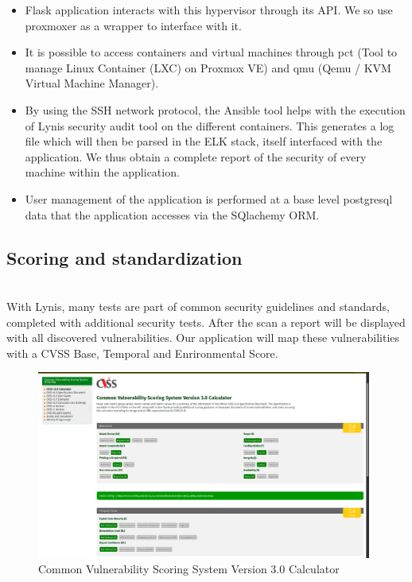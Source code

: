 \begin{itemize}
\item
  Flask application interacts with this hypervisor through its API. We
  so use proxmoxer as a wrapper to interface with
  it.
\item
  It is possible to access containers and virtual machines through
  pct (Tool to manage Linux Container (LXC) on Proxmox VE) and
  qmu (Qemu / KVM Virtual Machine Manager).
\item
  By using the SSH network protocol, the Ansible tool helps with the execution of
  Lynis security audit tool on the different containers. This generates a
  log file which will then be parsed in the ELK stack, itself
  interfaced with the application. We thus obtain a complete report of the
  security of every machine within the application.
\item
  User management of the application is performed at a base level
  postgresql data that the application accesses via the SQlachemy ORM.
\end{itemize}


\pagebreak

\subsection{Scoring and standardization}

\vspace{1cm}
\\
With Lynis, many tests are part of common security guidelines and standards,
completed with additional security tests. After the scan a report will be displayed
with all discovered vulnerabilities. Our application will map these vulnerabilities with a CVSS Base, Temporal and Enrironmental Score.

\vspace{0.2cm}

\begin{figure}[!h]
  \centering
  \includegraphics[width=0.98\textwidth]{images/cvss.png}
  \caption{Common Vulnerability Scoring System Version 3.0 Calculator}
  \label{ArchitectureSchema}
\end{figure}

